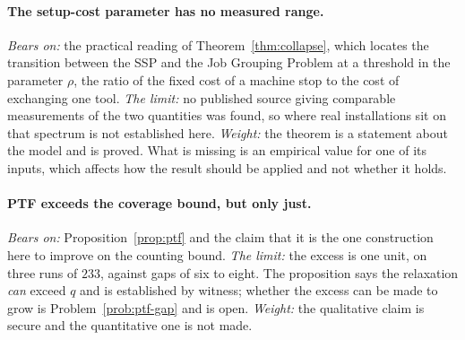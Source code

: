 \paragraph{The setup-cost parameter has no measured range.}
\emph{Bears on:} the practical reading of Theorem~\ref{thm:collapse}, which locates the
transition between the SSP and the Job Grouping Problem at a threshold in the parameter
$\rho$, the ratio of the fixed cost of a machine stop to the cost of exchanging one
tool.
\emph{The limit:} no published source giving comparable measurements of the two
quantities was found, so where real installations sit on that spectrum is not
established here.
\emph{Weight:} the theorem is a statement about the model and is proved. What is missing
is an empirical value for one of its inputs, which affects how the result should be
applied and not whether it holds.

\paragraph{PTF exceeds the coverage bound, but only just.}
\emph{Bears on:} Proposition~\ref{prop:ptf} and the claim that it is the one construction
here to improve on the counting bound.
\emph{The limit:} the excess is one unit, on three runs of $233$, against gaps of six to
eight. The proposition says the relaxation \emph{can} exceed $q$ and is established by
witness; whether the excess can be made to grow is Problem~\ref{prob:ptf-gap} and is
open.
\emph{Weight:} the qualitative claim is secure and the quantitative one is not made.
